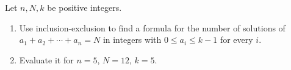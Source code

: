 Let $n,N,k$ be positive integers.
\begin{enumerate}
\item Use inclusion-exclusion to find a formula for the number of solutions of $a_1+a_2+\cdots+a_n=N$ in integers with $0\le a_i\le k-1$ for every $i$.
\item Evaluate it for $n=5$, $N=12$, $k=5$.
\end{enumerate}
